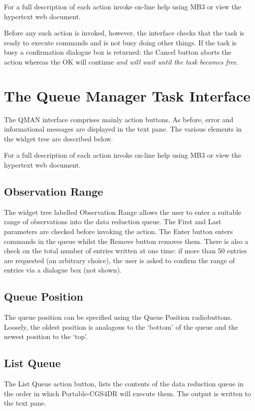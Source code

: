 \documentclass[a4paper]{book}
\renewcommand{\_}{{\tt\char'137}}
\begin{document}
For a full description of each action invoke on-line help using MB3 or view the hypertext web document.

Before any such action is invoked, however, the interface checks that the task is
ready to execute commands and is not busy doing other things. If the task is busy a confirmation 
dialogue box is returned: the {\sf Cancel} button aborts the action whereas the {\sf OK} will continue 
{\em and will wait until the task becomes free}.

\section{The Queue Manager Task Interface}
The QMAN interface comprises mainly action buttons.
As before, error and informational messages are displayed in the text pane.
The various elements in the widget tree are described below.

For a full description of each action invoke on-line help using MB3 or view the hypertext web document.

\subsection{Observation Range}
The widget tree labelled {\sf Observation Range} allows the user to enter a
suitable range of observations into the data reduction queue. The {\sf First}
and {\sf Last} parameters are checked before invoking the action. The {\sf Enter}
button enters commands in the queue whilst the {\sf Remove} button removes them.
There is also a check on the total number of entries written at one time: if
more than 50 entries are requested (an arbitrary choice), the user is asked to
confirm the range of entries via a dialogue box (not shown).

\subsection{Queue Position}
The queue position can be specified using the {\sf Queue Position} radiobuttons.
Loosely, the oldest position is analagous to the `bottom' of the queue and the
newest position to the `top'. 

\subsection{List Queue}
The {\sf List Queue} action button, lists the contents of the data reduction
queue in the order in which Portable-CGS4DR will execute them. The output is written to the text pane.
\end{document}
